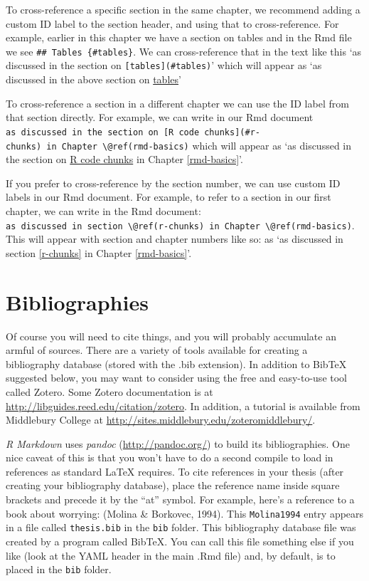 \documentclass[print]{nuthesis}
\begin{document}
To cross-reference a specific section in the same chapter, we recommend adding a custom ID label to the section header, and using that to cross-reference. For example, earlier in this chapter we have a section on tables and in the Rmd file we see \texttt{\#\#\ Tables\ \{\#tables\}}. We can cross-reference that in the text like this `as discussed in the section on \texttt{{[}tables{]}(\#tables)}' which will appear as `as discussed in the above section on \protect\hyperlink{tables}{tables}'

To cross-reference a section in a different chapter we can use the ID label from that section directly. For example, we can write in our Rmd document \texttt{as\ discussed\ in\ the\ section\ on\ {[}R\ code\ chunks{]}(\#r-chunks)\ in\ Chapter\ \textbackslash{}@ref(rmd-basics)} which will appear as `as discussed in the section on \protect\hyperlink{r-chunks}{R code chunks} in Chapter \ref{rmd-basics}'.

If you prefer to cross-reference by the section number, we can use custom ID labels in our Rmd document. For example, to refer to a section in our first chapter, we can write in the Rmd document: \texttt{as\ discussed\ in\ section\ \textbackslash{}@ref(r-chunks)\ in\ Chapter\ \textbackslash{}@ref(rmd-basics)}. This will appear with section and chapter numbers like so: as `as discussed in section \ref{r-chunks} in Chapter \ref{rmd-basics}'.

\hypertarget{bibliographies}{%
\section{Bibliographies}\label{bibliographies}}

Of course you will need to cite things, and you will probably accumulate an armful of sources. There are a variety of tools available for creating a bibliography database (stored with the .bib extension). In addition to BibTeX suggested below, you may want to consider using the free and easy-to-use tool called Zotero. Some Zotero documentation is at \url{http://libguides.reed.edu/citation/zotero}. In addition, a tutorial is available from Middlebury College at \url{http://sites.middlebury.edu/zoteromiddlebury/}.

\emph{R Markdown} uses \emph{pandoc} (\url{http://pandoc.org/}) to build its bibliographies. One nice caveat of this is that you won't have to do a second compile to load in references as standard LaTeX requires. To cite references in your thesis (after creating your bibliography database), place the reference name inside square brackets and precede it by the ``at'' symbol. For example, here's a reference to a book about worrying: (Molina \& Borkovec, 1994). This \texttt{Molina1994} entry appears in a file called \texttt{thesis.bib} in the \texttt{bib} folder. This bibliography database file was created by a program called BibTeX. You can call this file something else if you like (look at the YAML header in the main .Rmd file) and, by default, is to placed in the \texttt{bib} folder.
\end{document}
